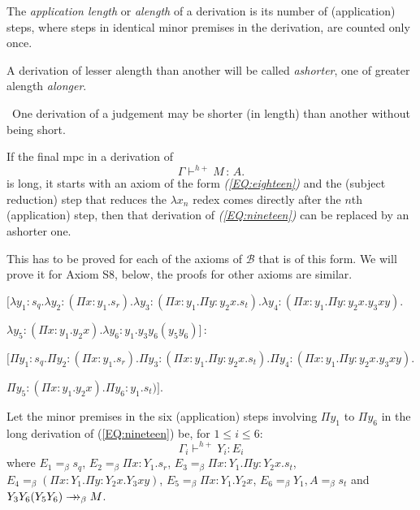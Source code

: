 \documentclass{LMCS}
\def\:{\mathbin{\,:\,}}
\begin{document}
\begin{defi}\label{D:alength}
  The \emph{application length} or \emph{alength} of a derivation is
  its number of (application) steps, where steps in identical minor
  premises in the derivation, are counted only once.

  A derivation of lesser alength than another will be called
  \emph{ashorter}, one of greater alength \emph{alonger}.
\end{defi}

 \ One derivation of a judgement may be shorter
  (in length) than another without being short.

\begin{lem}\label{L:twenty} If the final mpc in a derivation of
\begin{equation}\label{EQ:nineteen}
 \Gamma\vdash^{h+} M\:A.
\end{equation}
  is long, it starts with an axiom of the form
  \emph{(\ref{EQ:eighteen})} and the (subject reduction) step that
  reduces the $\lambda x_n$ redex comes directly after the $n$th
  (application) step, then that derivation of
  \emph{(\ref{EQ:nineteen})} can be replaced by an ashorter one.
\end{lem}

\proof This has to be proved for each of the axioms of $\mathcal B$
  that is of this form. We will prove it for Axiom {S8}, below, the
  proofs for other axioms are similar.
\bigskip

\quad 
$[\lambda y_1{:}s_q.\lambda y_2{:}(\Pi x{:}y_1.s_r).\lambda y_3{:}(\Pi x{:}y_1.\Pi y{:}y_2x.s_t).\lambda y_4{:}(\Pi x{:}y_1.\Pi y{:}y_2x.y_3xy).$

\noindent\phantom{\bf{S8}[}\quad
$\lambda y_5{:}(\Pi x{:}y_1.y_2x).
 \lambda y_6{:}y_1.y_3y_6(y_5y_6)]\:$\hfill

\noindent{}\quad
$[\Pi y_1{:}s_q.\Pi y_2{:}(\Pi x{:}y_1.s_r).\Pi y_3{:}(\Pi x{:}y_1.\Pi y{:}y_2x.s_t).\Pi y_4{:}(\Pi x{:}y_1.\Pi y{:}y_2x.y_3xy).$

\noindent\phantom{\bf{S8}[}\quad
$\Pi y_5{:}(\Pi x{:}y_1.y_2x).\Pi y_6{:}y_1. s_t)]$.
\bigskip

 \noindent Let the minor premises in the six (application) steps
 involving $\Pi y_1$ to $\Pi y_6$ in the long derivation of
 (\ref{EQ:nineteen}) be, for $1\le i\le 6$:
\[\Gamma_i\vdash^{h+} Y_i:E_i\]
  where $E_1=_{\beta}s_q$, $E_2=_{\beta}\Pi x{:}Y_1.s_r$, $E_3
  =_{\beta}\Pi x{:}Y_1.\Pi y{:}Y_2x.s_t$, $E_4=_{\beta} (\Pi
  x{:}Y_1.\Pi y{:}Y_2x.Y_3xy)$, $ E_5 =_{\beta}\Pi x{:}Y_1.Y_2x$,
  $E_6=_{\beta} Y_1, A=_{\beta}s_t$ and $Y_3Y_6(Y_5Y_6)\to\hskip -7pt
 \to_{\beta} M$.
\end{document}
